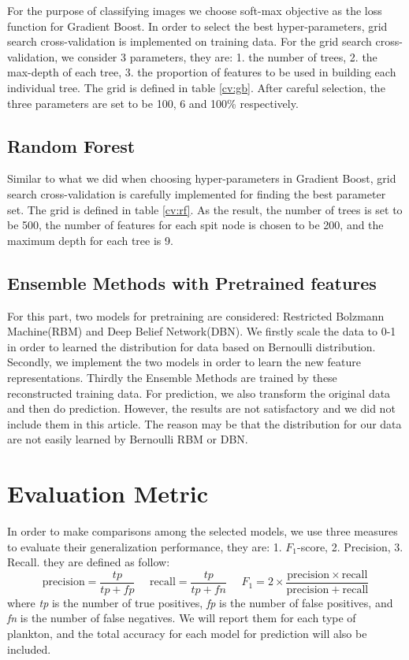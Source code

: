 \documentclass[11pt,oneside,a4paper]{article}
\numberwithin{equation}{section}
\begin{document}
For the purpose of classifying images we choose soft-max objective as the loss function for Gradient Boost. In order to select the best hyper-parameters, grid search cross-validation is implemented on training data. For the grid search cross-validation, we consider 3 parameters, they are: 1. the number of trees, 2. the max-depth of each tree, 3. the proportion of features to be used in building each individual tree. The grid is defined in table \ref{cv:gb}. After careful selection, the three parameters are set to be 100, 6 and 100\% respectively.

\subsection{Random Forest}

Similar to what we did when choosing hyper-parameters in Gradient Boost, grid search cross-validation is carefully implemented for finding the best parameter set. The grid is defined in table \ref{cv:rf}. As the result, the number of trees is set to be 500, the number of features for each spit node is chosen to be 200, and the maximum depth for each tree is 9.

\subsection{Ensemble Methods with Pretrained features}
For this part, two models for pretraining are considered: Restricted Bolzmann Machine(RBM) and Deep Belief Network(DBN). We firstly scale the data to 0-1 in order to learned the distribution for data based on Bernoulli distribution. Secondly, we implement the two models in order to learn the new feature representations. Thirdly the Ensemble Methods are trained by these reconstructed training data. For prediction, we also transform the original data and then do prediction. However, the results are not satisfactory and we did not include them in this article. The reason may be that the distribution for our data are not easily learned by Bernoulli RBM or DBN.

\section{Evaluation Metric}
In order to make comparisons among the selected models, we use three measures to evaluate their generalization performance, they are: 1. $F_1$-score, 2. Precision, 3. Recall. they are defined as follow:
$$\mathrm{precision} = \frac{tp}{tp + fp}~~~~~~
\mathrm{recall} = \frac{{tp}}{{tp + fn}}~~~~~~
F_{1} = 2 \times \frac{\mathrm{precision} \times \mathrm{recall}}{\mathrm{precision} + \mathrm{recall}}$$
where \textit{tp} is the number of true positives, \textit{fp} is the number of false positives, and \textit{fn} is the number of false negatives. We will report them for each type of plankton, and the total accuracy for each model for prediction will also be included.
\end{document}
